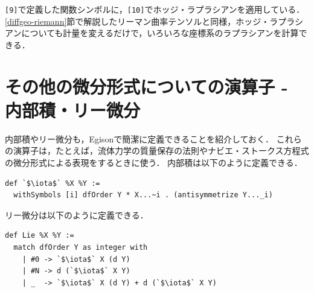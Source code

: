 \texttt{[9]}で定義した関数シンボルに，\texttt{[10]}でホッジ・ラプラシアンを適用している．
\ref{diffgeo-riemann}節で解説したリーマン曲率テンソルと同様，ホッジ・ラプラシアンについても計量を変えるだけで，いろいろな座標系のラプラシアンを計算できる．

\section{その他の微分形式についての演算子 - 内部積・リー微分}

内部積やリー微分も，Egisonで簡潔に定義できることを紹介しておく．
これらの演算子は，たとえば，流体力学の質量保存の法則やナビエ・ストークス方程式の微分形式による表現をするときに使う．
内部積は以下のように定義できる．
\begin{lstlisting}[language=egison,numbers=none]
def `$\iota$` %X %Y :=
  withSymbols [i] dfOrder Y * X...~i . (antisymmetrize Y..._i)
\end{lstlisting}
リー微分は以下のように定義できる．
\begin{lstlisting}[language=egison,numbers=none]
def Lie %X %Y :=
  match dfOrder Y as integer with
    | #0 -> `$\iota$` X (d Y)
    | #N -> d (`$\iota$` X Y)
    | _  -> `$\iota$` X (d Y) + d (`$\iota$` X Y)
\end{lstlisting}



